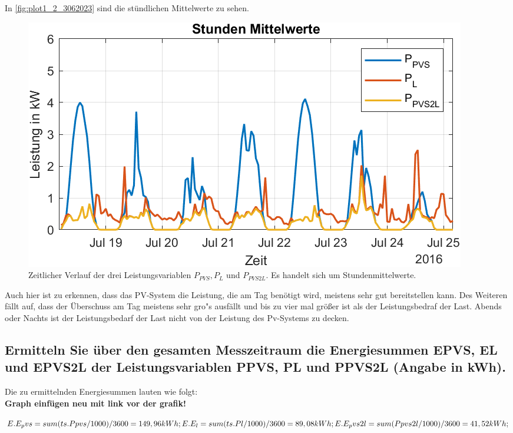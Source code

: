 In \autoref{fig:plot1_2_3062023} sind die stündlichen Mittelwerte zu sehen.
\begin{figure}[H]
    \centering
    \includegraphics[width=\textwidth]{Abbildungen/aufgabe1_plot2.png}
    \caption{Zeitlicher Verlauf der drei Leistungsvariablen $P_{PVS}, P_{L}$ und $P_{PVS2L}$. Es handelt sich um Stundenmittelwerte.}
    \label{fig:plot1_2_3062023}
\end{figure}
Auch hier ist zu erkennen, dass das PV-System die Leistung, die am Tag benötigt wird, meistens sehr gut bereitstellen kann. Des Weiteren fällt auf, dass der Überschuss am Tag meistens sehr gro"s ausfällt und bis zu vier mal größer ist als der Leistungsbedraf der Last. Abends oder Nachts ist der Leistungsbedarf der Last nicht von der Leistung des Pv-Systems zu decken.
\subsection{Ermitteln Sie über den gesamten Messzeitraum die Energiesummen EPVS, EL und EPVS2L der
Leistungsvariablen PPVS, PL und PPVS2L (Angabe in kWh).}
Die zu ermittelnden Energiesummen lauten wie folgt:
\\
\textbf{Graph einfügen neu mit link vor der grafik!}

$E.E_pvs = sum(ts.Ppvs/1000)/3600=149,96kWh;\\
E.E_l = sum(ts.Pl/1000)/3600=89,08kWh;\\
E.E_pvs2l = sum(Ppvs2l/1000)/3600=41,52kWh;$\\

